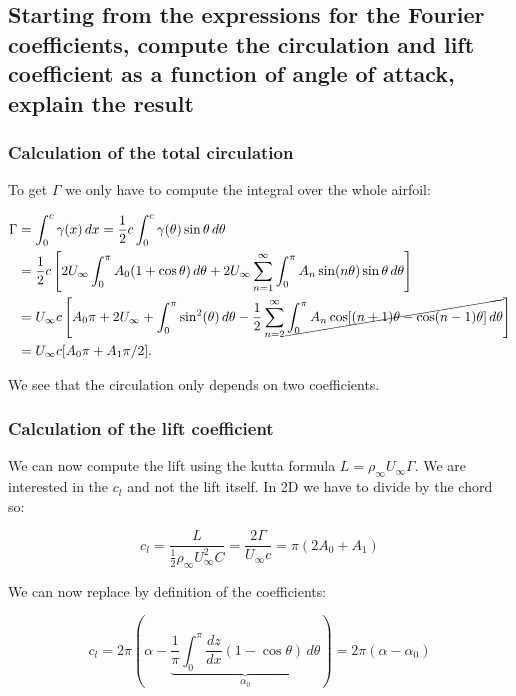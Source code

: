 \documentclass[british,french,11pt, a4paper, openany]{article}
\begin{document}
\subsection{Starting from the expressions for the Fourier coefficients, compute the
	circulation and lift coefficient as a function of angle of attack, explain the
	result}

\subsubsection{Calculation of the total circulation}

To get $\Gamma$ we only have to compute the integral over the whole airfoil:

\begin{equation}
\begin{aligned}
\Gamma &= \int _0 ^c \gamma (x) \, dx = \frac{1}{2} c \int _0 ^c \gamma (\theta ) \sin \theta \, d\theta \\
& = \frac{1}{2} c \left[ 2U_\infty \int _0 ^\pi A_0 (1+\cos\theta) \, d\theta + 2U_\infty \sum _{n=1}^\infty \int _0^\pi A_n \sin (n\theta)\sin \theta \, d\theta  \right] \\
&= U_\infty  c \left[  A_0 \pi  + 2U_\infty + \int _0^\pi \sin ^2(\theta) \, d\theta - \frac{1}{2} \sum _{n=2}^\infty \cancel{\int _0^\pi A_n \cos [(n+1)\theta - \cos (n-1)\theta ] \, d\theta } \right] \\
&= U_\infty c [A_0 \pi + A_1 \pi /2].
\end{aligned}
\end{equation}

We see that the circulation only depends on two coefficients. 

\subsubsection{Calculation of the lift coefficient}
We can now compute the lift using the kutta formula $L = \rho _\infty U_\infty \Gamma$. We are interested in the $c_l$ and not the lift itself. In 2D we have to divide by the chord so: 

\begin{equation}
c_l = \frac{L}{\frac{1}{2} \rho _\infty U_\infty ^2 C} = \frac{2\Gamma}{U_\infty c} = \pi (2A_0 + A_1)
\label{eq:2.70}
\end{equation}

We can now replace by definition of the coefficients: 

\begin{equation}
c_l = 2\pi\left(\alpha - \underbrace{\frac{1}{\pi} \int _0^\pi \frac{dz}{dx} (1-\cos \theta)\, d\theta}_{\alpha _0} \right) = 2\pi (\alpha - \alpha _0)
\label{eq:2.71}
\end{equation}
\end{document}
